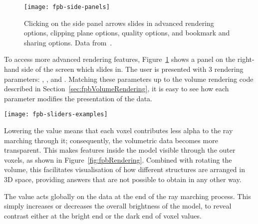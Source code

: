 \begin{figure}[htbp!]
\centering
\texttt{[image: fpb-side-panels]}
\caption[FPBioimage: Side panels provide more advanced rendering options]{Clicking on the side panel arrows slides in advanced rendering options, clipping plane options, quality options, and bookmark and sharing options. Data from~\cite{kumar2014dual}. } %
\label{fig:FPBpanels}
\end{figure}

To access more advanced rendering features, Figure~\ref{fig:FPBpanels} shows a panel on the right-hand side of the screen which slides in.
The user is presented with 3 rendering parameters: , , and .
Matching these parameters up to the volume rendering code described in Section~\ref{sec:fpbVolumeRendering}, it is easy to see how each parameter modifies the presentation of the data.

\begin{sidewaysfigure}[p]
\centering
\texttt{[image: fpb-sliders-examples]} %
\caption[FPBioimage: Advanced rendering features provide unique views of volumetric data]{(a–c): Four-colour OPT data of a mouse embryo. (d–f): MRI data of a human head. (g–i): two-colour light-sheet microscopy data of a drosophila embryo. FPBioimage's built-in transparency feature has been used to render (c) and (f), revealing data within the volume; the cutting tool has been used for (c), (f), (h) and (i), removing outer voxels from the data; and h shows a bookmark in creation, which can be shared with other users. Reproduced from \cite{fantham2017new}. Raw data provided by: (a–c), J. McGinty~\cite{sharpe2002optical}; (d–f), Stanford Volume Data Archive~\cite{levoy1988volume}; (g–i), P. Keller~\cite{chhetri2015whole}. }
\label{fig:fpbRendering}
\end{sidewaysfigure}

Lowering the  value means that each voxel contributes less alpha to the ray marching through it; consequently, the volumetric data becomes more transparent.
This makes features inside the model visible through the outer voxels, as shown in Figure~\ref{fig:fpbRendering}.
Combined with rotating the volume, this facilitates visualisation of how different structures are arranged in 3D space, providing answers that are not possible to obtain in any other way.

The  value acts globally on the data at the end of the ray marching process.
This simply increases or decreases the overall brightness of the model, to reveal contrast either at the bright end or the dark end of voxel values. %

